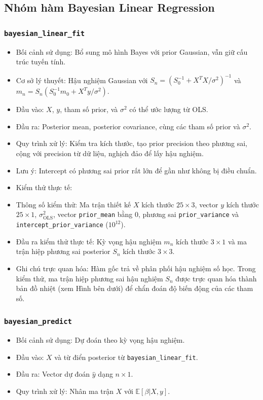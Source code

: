 \documentclass[a4paper]{article}
\newcommand{\code}[1]{\colorbox{light-gray}{\texttt{#1}}}
\begin{document}
\subsection{Nhóm hàm Bayesian Linear Regression}

\subsubsection{\texorpdfstring{\code{bayesian\_linear\_fit}}{bayesian\_linear\_fit}}
\begin{itemize}[leftmargin=*]
    \item Bối cảnh sử dụng: Bổ sung mô hình Bayes với prior Gaussian, vẫn giữ cấu trúc tuyến tính.
    \item Cơ sở lý thuyết: Hậu nghiệm Gaussian với $S_n=(S_0^{-1}+X^T X/\sigma^2)^{-1}$ và $m_n=S_n(S_0^{-1}m_0+X^T y/\sigma^2)$.
    \item Đầu vào: $X$, $y$, tham số prior, và $\sigma^2$ có thể ước lượng từ OLS.
    \item Đầu ra: Posterior mean, posterior covariance, cùng các tham số prior và $\sigma^2$.
    \item Quy trình xử lý: Kiểm tra kích thước, tạo prior precision theo phương sai, cộng với precision từ dữ liệu, nghịch đảo để lấy hậu nghiệm.
    \item Lưu ý: Intercept có phương sai prior rất lớn để gần như không bị điều chuẩn.
    \item Kiểm thử thực tế:
    \item Thông số kiểm thử: Ma trận thiết kế $X$ kích thước $25 \times 3$, vector $y$ kích thước $25 \times 1$, $\sigma^2_{\text{OLS}}$, vector \texttt{prior\_mean} bằng 0, phương sai \texttt{prior\_variance} và \texttt{intercept\_prior\_variance} ($10^{12}$).
    \item Đầu ra kiểm thử thực tế: Kỳ vọng hậu nghiệm $m_n$ kích thước $3 \times 1$ và ma trận hiệp phương sai posterior $S_n$ kích thước $3 \times 3$.
    \item Ghi chú trực quan hóa: Hàm gốc trả về phân phối hậu nghiệm số học. Trong kiểm thử, ma trận hiệp phương sai hậu nghiệm $S_n$ được trực quan hóa thành bản đồ nhiệt (xem Hình bên dưới) để chẩn đoán độ biến động của các tham số.
\end{itemize}

\subsubsection{\texorpdfstring{\code{bayesian\_predict}}{bayesian\_predict}}
\begin{itemize}[leftmargin=*]
    \item Bối cảnh sử dụng: Dự đoán theo kỳ vọng hậu nghiệm.
    \item Đầu vào: $X$ và từ điển posterior từ \texttt{bayesian\_linear\_fit}.
    \item Đầu ra: Vector dự đoán $\hat{y}$ dạng $n\times1$.
    \item Quy trình xử lý: Nhân ma trận $X$ với $\mathbb{E}[\beta|X,y]$.
\end{itemize}
\end{document}
